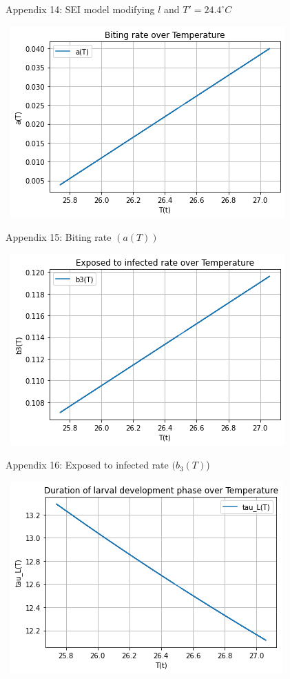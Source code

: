 \documentclass[
	12pt,				%
	oneside,			%
	a4paper,			%
	english,			%
	brazil				%
	]{abntex2}
\begin{document}
\begin{apendicesenv}
\begin{figure}[!ht]
	\caption*{Appendix 14: SEI model modifying $l$ and $T'=24.4^\circ C$}
\end{figure}
\newpage
\begin{figure}[!ht]
	\centering
	\hbox{\hspace{3.5em} \includegraphics[scale=0.8] {THESIS-Plot_a(T).png}}
	\caption*{Appendix 15: Biting rate $(a(T))$}
\end{figure} 
\begin{figure}[!ht]
	\centering
	\hbox{\hspace{3.5em} \includegraphics[scale=0.8] {THESIS-Plot_b3(T).png}}
	\caption*{Appendix 16: Exposed to infected rate $(b_3(T)$)}
\end{figure}
\newpage
\begin{figure}[!ht]
	\centering
	\hbox{\hspace{3.8em} \includegraphics[scale=0.8] {THESIS-Plot_tau_L(T).png}}

\end{figure}
\end{apendicesenv}
\end{document}

